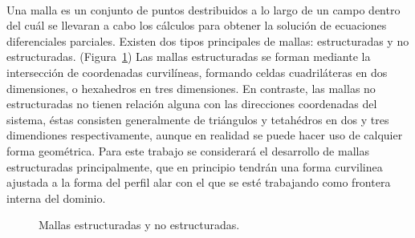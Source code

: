 \documentclass[letterpaper, openright, 12pt]{book}
\begin{document}
    \paragraph*{}
        Una malla es un conjunto de puntos destribuidos a lo largo de un campo
        dentro del cuál se llevaran a cabo los cálculos para obtener la solución
        de ecuaciones diferenciales parciales. Existen dos tipos principales de
        mallas: estructuradas y no estructuradas. (Figura~\ref{fig:malla-estructurada-noestructurada})
        Las mallas estructuradas se forman mediante la intersección de
        coordenadas curvilíneas, formando celdas cuadriláteras en dos
        dimensiones, o hexahedros en tres dimensiones. En contraste, las mallas
        no estructuradas no tienen relación alguna con las direcciones
        coordenadas del sistema, éstas consisten generalmente de triángulos y
        tetahédros en dos y tres dimendiones respectivamente, aunque en realidad
        se puede hacer uso de calquier forma geométrica. Para este trabajo se
        considerará el desarrollo  de  mallas estructuradas principalmente, que
        en principio tendrán una forma curvilinea ajustada a la forma del perfil
        alar con el que se esté trabajando como frontera interna del dominio.
    \begin{figure}[htbp!]
        \centering
         \hspace{20mm} %
        \caption[Mallas estructuradas y no estructuradas]{Mallas estructuradas
        y no estructuradas.\cite{cengel}}
        \label{fig:malla-estructurada-noestructurada}
    \end{figure}
\end{document}
